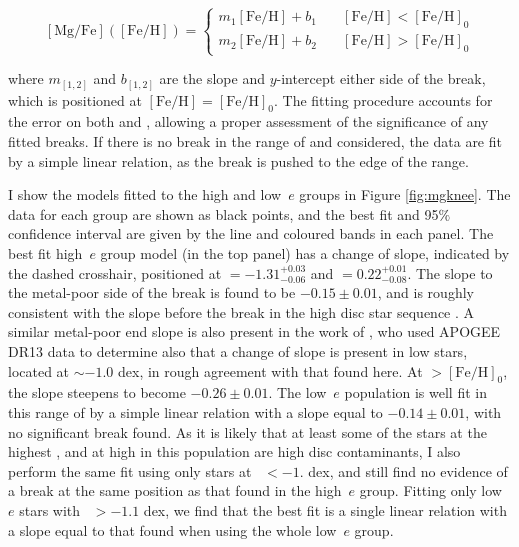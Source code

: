 \begin{equation}
\label{eq:pwlin}
\mathrm{[Mg/Fe]}(\mathrm{[Fe/H]}) =
  \begin{cases}
    m_{1}\mathrm{[Fe/H]} + b_1  &  \quad \mathrm{[Fe/H]} < \mathrm{[Fe/H]}_0\\
    m_{2}\mathrm{[Fe/H]} + b_2  &  \quad \mathrm{[Fe/H]} > \mathrm{[Fe/H]}_0
  \end{cases}
\end{equation}

\noindent where $m_{[1,2]}$ and $b_{[1,2]}$ are the slope and
$y$-intercept either side of the break, which is positioned at
$\mathrm{[Fe/H]}=\mathrm{[Fe/H]}_0$. The fitting procedure accounts
for the error on both \mgfe{} and \feh{}, allowing a proper assessment
of the significance of any fitted breaks. If there is no break in
the range of \mgfe{} and \feh{} considered, the data are fit by a
simple linear relation, as the break is pushed to the edge of the
\feh{} range.

I show the models fitted to the high and low~$e$ groups in Figure
\ref{fig:mgknee}. The data for each group are shown as black
points, and the best fit and 95$\%$ confidence interval are given
by the line and coloured bands in each panel. The best fit high~$e$ group
model (in the top panel) has a change of slope, indicated by the dashed crosshair, positioned at
\feh{}$=-1.31^{+0.03}_{-0.06}$ and \mgfe{}$=0.22^{+0.01}_{-0.08}$.
The  slope to the metal-poor side of the break is found to
be $-0.15\pm{0.01}$, and is roughly consistent with the slope before
the break in the high \mgfe{} disc star sequence \citep[e.g. that
seen in][]{2015ApJ...808..132H}. A similar metal-poor end slope 
is also present in the work of \citet{2018ApJ...852...50F},
who used APOGEE DR13 data to determine also that a change of slope
is present in low \mgfe{} stars, located at \feh{}$\sim-1.0$ dex,
in rough agreement with that found here. At \feh{}$>\mathrm{[Fe/H]}_0$,
the slope steepens to become $-0.26\pm{0.01}$. The low~$e$ population
is well fit in this range of \feh{} by a simple linear relation
with a slope equal to $-0.14\pm{0.01}$, with no significant break
found. As it is likely that at least some of the stars at the highest
\feh{}, and at high \mgfe{} in this population are high \afe{} disc
contaminants, I also perform the same fit using only stars at \feh{}~$<-1.$
dex, and still find no evidence of a break at the same position as
that found in the high~$e$ group. Fitting only low~$e$ stars with
\feh{}~$>-1.1$ dex, we find that the best fit is a single linear
relation with a slope equal to that found when using the whole
low~$e$ group.

